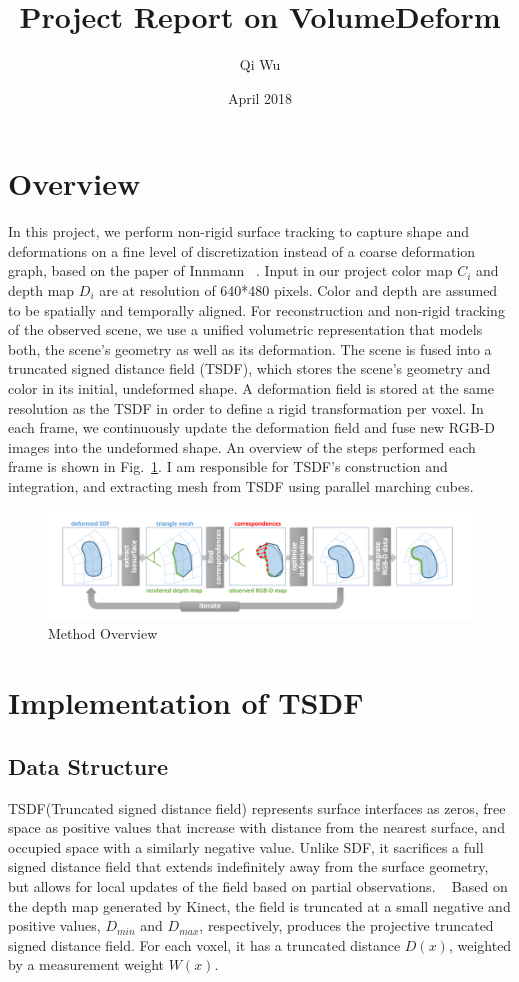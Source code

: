\documentclass{article}
\title{Project Report on VolumeDeform}
\author{Qi Wu }
\date{April 2018}
\begin{document}
\maketitle

\section{Overview}
In this project, we perform non-rigid surface tracking to capture shape and deformations on a fine level of discretization instead of a coarse deformation graph, based on the paper of Innmann ~\cite{innmann2016volumedeform}. Input in our project color map $C_i$ and depth map $D_i$ are at resolution of 640*480 pixels. Color and depth are assumed to be spatially and temporally aligned. For reconstruction and non-rigid tracking of the observed scene, we use a unified volumetric representation that models both, the scene’s geometry as well as its deformation. The scene is fused into a truncated signed distance field (TSDF), which stores the scene’s geometry and color in its initial, undeformed shape. A deformation field is stored at the same resolution as the TSDF in order to define a rigid transformation per voxel. In each frame, we continuously update the deformation field and fuse new RGB-D images into the undeformed shape. An overview of the steps performed each frame is shown in Fig.~\ref{fig:pipeline}. I am responsible for TSDF's construction and integration, and extracting mesh from TSDF using parallel marching cubes.
\begin{figure}[htp]
\centering
\includegraphics[width=12cm]{figures/pipeline.png}
\caption{Method Overview}
\label{fig:pipeline}
\end{figure}


\section{Implementation of TSDF}
\subsection{Data Structure}
TSDF(Truncated signed distance field) represents surface interfaces as zeros, free space as positive values that increase with distance from the nearest surface, and occupied space with a similarly negative value. Unlike SDF, it sacrifices a full signed distance field that extends indefinitely away from the surface geometry, but allows for local updates of the field based on partial observations. ~\cite{CanelhasDanielRicao2017Tsdf} Based on the depth map generated by Kinect, the field is truncated at a small negative and positive values, $D_{min}$ and $D_{max}$, respectively, produces the projective truncated signed distance field. For each voxel, it has a truncated distance $D{(x)}$, weighted by a measurement weight $W{(x)}$.
\end{document}
